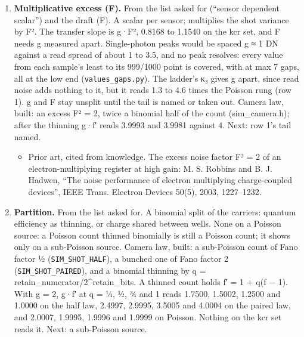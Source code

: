 \begin{enumerate}
\item \textbf{Multiplicative excess (F).} From the list asked for (“sensor dependent scalar”) and the draft (F). A scalar per sensor; multiplies the shot variance by F². The transfer slope is g·F², 0.8168 to 1.1540 on the kcr set, and F needs g measured apart. Single-photon peaks would be spaced g ≈ 1 DN against a read spread of about 1 to 3.5, and no peak resolves: every value from each sample's least to its 999/1000 point is covered, with at max 7 gaps, all at the low end (\texttt{values\_\allowbreak{}gaps.\allowbreak{}py}). The ladder's κ₃ gives g apart, since read noise adds nothing to it, but it reads 1.3 to 4.6 times the Poisson rung (row 1). g and F stay unsplit until the tail is named or taken out. Camera law, built: an excess F² = 2, twice a binomial half of the count (sim\_\allowbreak{}camera.h); after the thinning g·f′ reads 3.9993 and 3.9981 against 4. Next: row 1's tail named.

\begin{itemize}
\item Prior art, cited from knowledge. The excess noise factor F² = 2 of an electron-multiplying register at high gain: M. S. Robbins and B. J. Hadwen, “The noise performance of electron multiplying charge-coupled devices”, IEEE Trans. Electron Devices 50(5), 2003, 1227–1232.
\end{itemize}
\item \textbf{Partition.} From the list asked for. A binomial split of the carriers: quantum efficiency as thinning, or charge shared between wells. None on a Poisson source: a Poisson count thinned binomially is still a Poisson count; it shows only on a sub-Poisson source. Camera law, built: a sub-Poisson count of Fano factor ½ (\texttt{SIM\_\allowbreak{}SHOT\_\allowbreak{}HALF}), a bunched one of Fano factor 2 (\texttt{SIM\_\allowbreak{}SHOT\_\allowbreak{}PAIRED}), and a binomial thinning by q = retain\_\allowbreak{}numerator/2\textasciicircum{}retain\_\allowbreak{}bits. A thinned count holds f′ = 1 + q(f − 1). With g = 2, g·f′ at q = ¼, ½, ¾ and 1 reads 1.7500, 1.5002, 1.2500 and 1.0000 on the half law, 2.4997, 2.9995, 3.5005 and 4.0004 on the paired law, and 2.0007, 1.9995, 1.9996 and 1.9999 on Poisson. Nothing on the kcr set reads it. Next: a sub-Poisson source.


\end{enumerate}
